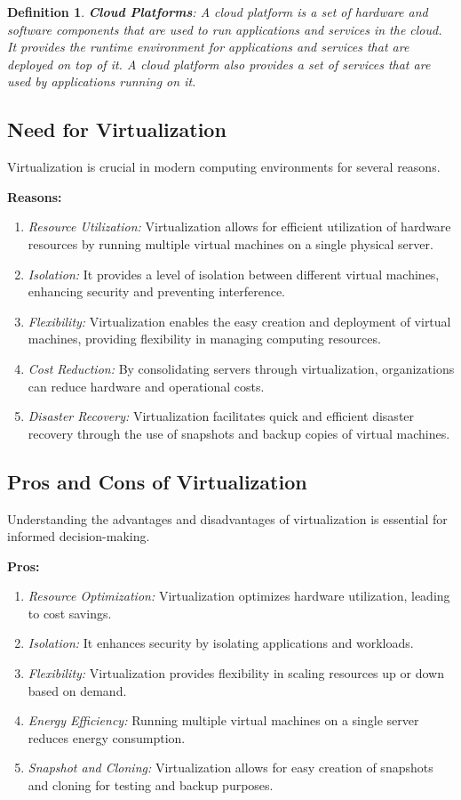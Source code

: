 \documentclass[11pt]{article}
\newtheorem{dfn}[thm]{Definition}
\begin{document}
\begin{dfn}
    \textbf{Cloud Platforms}: A cloud platform is a set of hardware and software components that are used to run applications and services in the cloud. It provides the runtime environment for applications and services that are deployed on top of it. A cloud platform also provides a set of services that are used by applications running on it. 
\end{dfn}

\subsection{Need for Virtualization}
Virtualization is crucial in modern computing environments for several reasons.

\textbf{Reasons:}
\begin{enumerate}
    \item \textit{Resource Utilization:} Virtualization allows for efficient utilization of hardware resources by running multiple virtual machines on a single physical server.
    \item \textit{Isolation:} It provides a level of isolation between different virtual machines, enhancing security and preventing interference.
    \item \textit{Flexibility:} Virtualization enables the easy creation and deployment of virtual machines, providing flexibility in managing computing resources.
    \item \textit{Cost Reduction:} By consolidating servers through virtualization, organizations can reduce hardware and operational costs.
    \item \textit{Disaster Recovery:} Virtualization facilitates quick and efficient disaster recovery through the use of snapshots and backup copies of virtual machines.
\end{enumerate}

\subsection{Pros and Cons of Virtualization}
Understanding the advantages and disadvantages of virtualization is essential for informed decision-making.

\textbf{Pros:}
\begin{enumerate}
    \item \textit{Resource Optimization:} Virtualization optimizes hardware utilization, leading to cost savings.
    \item \textit{Isolation:} It enhances security by isolating applications and workloads.
    \item \textit{Flexibility:} Virtualization provides flexibility in scaling resources up or down based on demand.
    \item \textit{Energy Efficiency:} Running multiple virtual machines on a single server reduces energy consumption.
    \item \textit{Snapshot and Cloning:} Virtualization allows for easy creation of snapshots and cloning for testing and backup purposes.
\end{enumerate}
\end{document}
